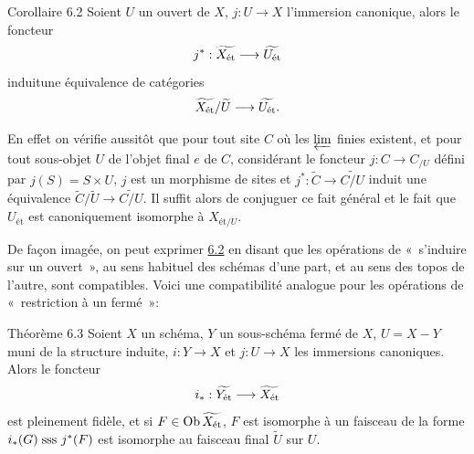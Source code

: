\documentclass[10pt]{../fichiers-configuration-latex/smfart}
\begin{document}
\begin{enonce*}{Corollaire 6.2}
Soient $U$ un ouvert de $X$, $j : U \to X$ l'immersion canonique,
alors le foncteur
$$
j^{\ast} :  \widetilde{X_{\text{\rm ét}}} \to \widetilde{U_{\text{\rm ét}}}
$$
induit\pageoriginale une équivalence de catégories
$$
\widetilde{X_{\text{\rm ét}}} / \widetilde{U} \to
\widetilde{U_{\text{\rm ét}}}{\quoi}.
$$
\end{enonce*}

En effet on vérifie aussitôt que pour tout site $C$ où les
$\varprojlim$ finies existent, et pour tout sous-objet $U$ de l'objet
final $e$ de $C$, considérant le foncteur $j : C \to C_{/U}$ défini
par $j(S) = S \times U$, $j$ est un morphisme de sites et $j^{\ast} :
\widetilde{C} \to \widetilde{C/U}$ induit une équivalence
$\widetilde{C}/\widetilde{U} \to \widetilde{C / U}$. Il
  suffit alors de conjuguer ce fait général et le fait que $U_{\text{ét}}$ est
  canoniquement isomorphe à $X_{\text{ét}/U}$.

De façon imagée, on peut exprimer \hyperref[VIII.cor6.2]{6.2} en disant que les opérations
de « s'induire sur un ouvert », au sens habituel des schémas d'une
part, et au sens des topos de l'autre, sont compatibles. Voici une
compatibilité analogue pour les opérations de « restriction à un
fermé »:

\begin{enonce*}{Théorème 6.3}
Soient $X$ un schéma, $Y$ un sous-schéma fermé de $X$, $U
= X - Y$ muni de la structure induite, $i : Y \to X$ et $j : U \to X$
les immersions canoniques. Alors le foncteur
$$
i_{\ast} : \widetilde{Y_{\text{\rm ét}}} \to \widetilde{X_{\text{\rm ét}}}
$$
est pleinement fidèle, et si $F \in \operatorname{Ob} \widetilde{X_{\text{\rm ét}}}$, $F$
est isomorphe à un faisceau de la forme $i_{\ast} (G) \text{\;\rm sss } j^{\ast}(F)$
est isomorphe au faisceau final $\widetilde{U}$ sur  $U$.
\end{enonce*}
\end{document}
